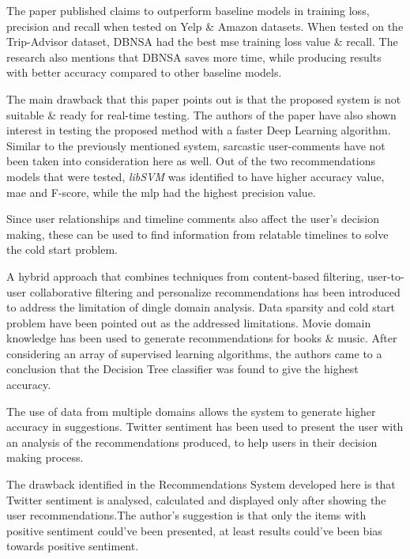 The paper published claims to outperform baseline models in training loss, precision and recall when tested on Yelp \& Amazon datasets. When tested on the Trip-Advisor dataset, DBNSA had the best \gls{mse} training loss value \& recall. The research also mentions that DBNSA saves more time, while producing results with better accuracy compared to other baseline models.

The main drawback that this paper points out is that the proposed system is not suitable \& ready for real-time testing. The authors of the paper have also shown interest in testing the proposed method with a faster Deep Learning algorithm. Similar to the previously mentioned system, sarcastic user-comments have not been taken into consideration here as well.
Out of the two recommendations models that were tested, \emph{libSVM} was identified to have higher accuracy value, \gls{mae} and F-score, while the \gls{mlp} had the highest precision value.

Since user relationships and timeline comments also affect the user's decision making, these can be used to find information from relatable timelines to solve the cold start problem.

\bigbreak
A hybrid approach that combines techniques from content-based filtering, user-to-user collaborative filtering and personalize recommendations \autocite{ayushi_cross-domain_2018} has been introduced to address the limitation of dingle domain analysis. Data sparsity and cold start problem have been pointed out as the addressed limitations. Movie domain knowledge has been used to generate recommendations for books \& music. 
After considering an array of supervised learning algorithms, the authors came to a conclusion that the Decision Tree classifier was found to give the highest accuracy.

The use of data from multiple domains allows the system to generate higher accuracy in suggestions. Twitter sentiment has been used to present the user with an analysis of the recommendations produced, to help users in their decision making process.

The drawback identified in the Recommendations System developed here is that Twitter sentiment is analysed, calculated and displayed only after showing the user recommendations.The author's suggestion is that only the items with positive sentiment could've been presented, at least results could've been bias towards positive sentiment.

